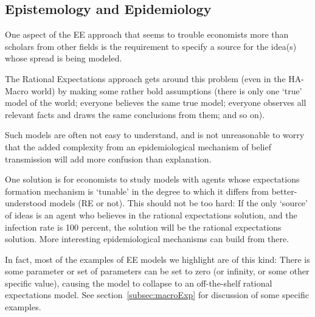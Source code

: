 \subsection{Epistemology and Epidemiology}

    One aspect of the EE approach that seems to trouble economists more than scholars from other fields is the requirement to specify a source for the idea(s) whose spread is being modeled.

    The Rational Expectations approach gets around this problem (even in the HA-Macro world) by making some rather bold assumptions (there is only one `true' model of the world; everyone believes the same true model; everyone observes all relevant facts and draws the same conclusions from them; and so on).  %

    Such models are often not easy to understand, and is not unreasonable to worry that the added complexity from an epidemiological mechanism of belief transmission will add more confusion than explanation.

    One solution is for economists to study models with agents whose expectations formation mechanism is `tunable' in the degree to which it differs from better-understood models (RE or not).  This should not be too hard:  If the only `source' of ideas is an agent who believes in the rational expectations solution, and the infection rate is 100 percent, the solution will be the rational expectations solution.  More interesting epidemiological mechanisms can build from there.

    In fact, most of the examples of EE models we highlight are of this kind: There is some parameter or set of parameters can be set to zero (or infinity, or some other specific value), causing the model to collapse to an off-the-shelf rational expectations model.  See section~\ref{subsec:macroExp} for discussion of some specific examples.

